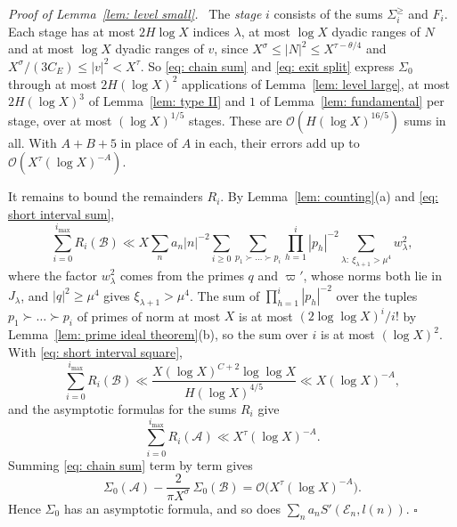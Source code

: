 \documentclass{article}
\numberwithin{equation}{section}
\newenvironment{proof}[1][Proof]{\par\medskip\noindent\textit{#1.}\ }{\hfill$\square$\par\medskip}
\newcommand{\Le}{\leqslant}
\newcommand{\Ge}{\geqslant}
\begin{document}
\begin{proof}[Proof of Lemma~\ref{lem: level small}]
The \emph{stage} $i$ consists of the sums $\Sigma^{\Ge}_i$ and $F_i$. Each stage has at most $2H \log X$ indices $\lambda$, at most $\log X$ dyadic ranges of $N$ and at most $\log X$ dyadic ranges of $v$, since $X^{\sigma} \Le |N|^2 \Le X^{\tau - \theta/4}$ and $X^{\sigma}/(3C_E) \Le |v|^2 < X^{\tau}$. So \eqref{eq: chain sum} and \eqref{eq: exit split} express $\Sigma_0$ through at most $2H(\log X)^2$ applications of Lemma~\ref{lem: level large}, at most $2H(\log X)^3$ of Lemma~\ref{lem: type II} and $1$ of Lemma~\ref{lem: fundamental} per stage, over at most $(\log X)^{1/5}$ stages. These are $\mathcal{O}(H (\log X)^{16/5})$ sums in all. With $A + B + 5$ in place of $A$ in each, their errors add up to $\mathcal{O}(X^{\tau}(\log X)^{-A})$.

It remains to bound the remainders $R_i$. By Lemma~\ref{lem: counting}(a) and \eqref{eq: short interval sum},
\begin{equation*}
\sum_{i=0}^{i_{\max}} R_i(\mathcal{B}) \ll X \sum_n a_n |n|^{-2} \sum_{i \Ge 0} \sum_{p_1 \succ \dots \succ p_i} \prod_{h=1}^{i} |p_h|^{-2} \sum_{\lambda:\ \xi_{\lambda + 1} > \mu^4} w_\lambda^2,
\end{equation*}
where the factor $w_\lambda^2$ comes from the primes $q$ and $\varpi'$, whose norms both lie in $J_\lambda$, and $|q|^2 \Ge \mu^4$ gives $\xi_{\lambda + 1} > \mu^4$. The sum of $\prod_{h=1}^{i} |p_h|^{-2}$ over the tuples $p_1 \succ \dots \succ p_i$ of primes of norm at most $X$ is at most $(2\log\log X)^i/i!$ by Lemma~\ref{lem: prime ideal theorem}(b), so the sum over $i$ is at most $(\log X)^2$. With \eqref{eq: short interval square},
\begin{equation*}
\sum_{i=0}^{i_{\max}} R_i(\mathcal{B}) \ll \frac{X (\log X)^{C+2} \log\log X}{H (\log X)^{4/5}} \ll X(\log X)^{-A},
\end{equation*}
and the asymptotic formulas for the sums $R_i$ give
\begin{equation*}
\sum_{i=0}^{i_{\max}} R_i(\mathcal{A}) \ll X^{\tau}(\log X)^{-A}.
\end{equation*} Summing \eqref{eq: chain sum} term by term gives
\begin{equation*}
\Sigma_0(\mathcal{A}) - \frac{2}{\pi X^{\sigma}}\, \Sigma_0(\mathcal{B}) = \mathcal{O}\bigl(X^{\tau}(\log X)^{-A}\bigr).
\end{equation*}
Hence $\Sigma_0$ has an asymptotic formula, and so does $\sum_n a_n S'(\mathcal{E}_n, l(n))$.
\end{proof}
\end{document}
